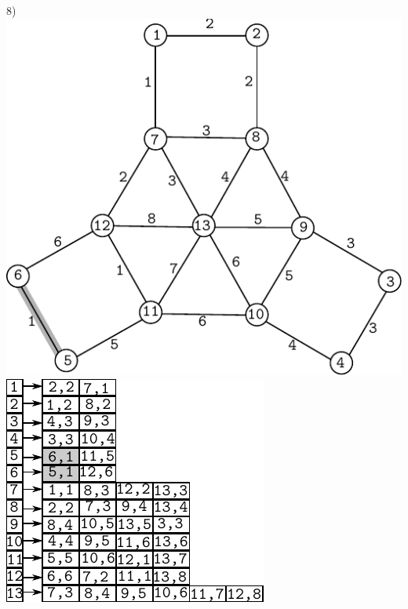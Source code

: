 \documentclass{article}
\begin{document}
\begin{center}
8)\includegraphics[scale=0.6]{bottleneck/g8}
\hspace{5mm}
\includegraphics[scale=0.9]{bottleneck/l8}
\end{center}
\end{document}
